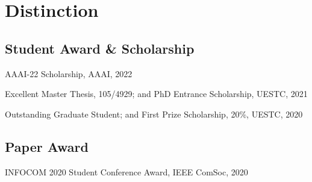 \section*{Distinction}


\subsection*{\hspace{1.6em}Student Award \& Scholarship}
\indent

AAAI-22 Scholarship, AAAI, 2022

Excellent Master Thesis, 105/4929; and PhD Entrance Scholarship, UESTC, 2021

Outstanding Graduate Student; and First Prize Scholarship, 20\%, UESTC, 2020

\subsection*{\hspace{1.6em}Paper Award}
\indent

INFOCOM 2020 Student Conference Award, IEEE ComSoc, 2020

